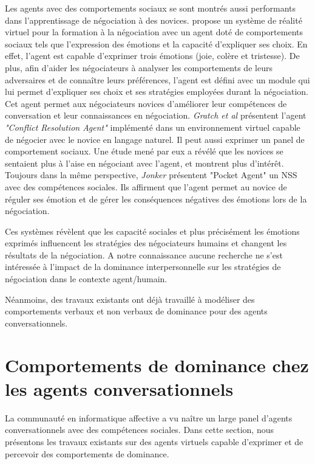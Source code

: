 	 
	 Les agents avec des comportements sociaux se sont montrés aussi performants dans l'apprentissage de négociation à des novices. \cite{broekens2012virtual} propose un système de réalité virtuel pour la formation à la négociation avec un agent doté de comportements sociaux tels que l'expression des émotions et la capacité d'expliquer ses choix. En effet, l'agent est capable d'exprimer trois émotions (joie, colère et tristesse). De plus, afin d'aider les négociateurs à analyser les comportements de leurs adversaires et de connaître leurs préférences, l'agent est défini avec un module qui lui permet d'expliquer ses choix et ses stratégies employées durant la négociation. Cet agent permet aux négociateurs novices d'améliorer leur compétences de conversation et leur connaissances en négociation. 
	 \emph{Gratch et al} \cite{gratch2016benefits} présentent l'agent \textit{"Conflict Resolution Agent"} implémenté dans un environnement virtuel capable de négocier avec le novice en langage naturel. Il peut aussi exprimer un panel de comportement sociaux. Une étude mené par eux a révélé que les novices se sentaient plus à l'aise en négociant avec l'agent, et montrent plus d'intérêt. Toujours dans la même perspective, \emph{Jonker} \cite{jonker2012negotiating} présentent "Pocket Agent" un NSS avec des compétences sociales. Ils affirment que l'agent permet au novice de réguler ses émotion et de gérer les conséquences négatives des émotions lors de la négociation.
	 
	 Ces systèmes révèlent que les capacité sociales et plus précisément les émotions exprimés influencent les stratégies des négociateurs humains et changent les résultats de la négociation. A notre connaissance aucune recherche ne s'est intéressée à l'impact de la dominance interpersonnelle sur les stratégies de négociation dans le contexte agent/humain. 
	 
	 Néanmoins, des travaux existants ont déjà travaillé à modéliser des comportements verbaux et non verbaux de dominance pour des agents conversationnels. 
	 
	 \section{Comportements de dominance chez les agents conversationnels}
	 
	 	La communauté en informatique affective a vu naître un large panel d'agents conversationnels avec des compétences sociales. Dans cette section, nous présentons les travaux existants sur des agents virtuels capable d'exprimer et de percevoir des comportements de dominance. 
	 	
